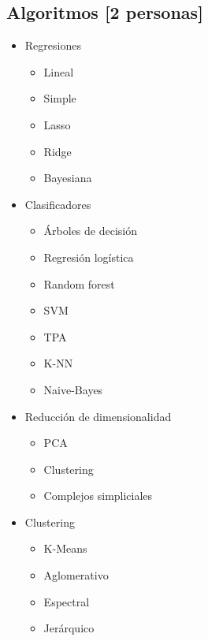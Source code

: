 \documentclass{article}
\begin{document}
        \subsection{Algoritmos [2 personas]}
            \begin{itemize}
                \item Regresiones
                \begin{itemize}
                    \item Lineal
                    \item Simple
                    \item Lasso
                    \item Ridge
                    \item Bayesiana
                \end{itemize}

                \item Clasificadores
                \begin{itemize}
                    \item Árboles de decisión
                    \item Regresión logística
                    \item Random forest
                    \item SVM
                    \item TPA
                    \item K-NN
                    \item Naive-Bayes
                \end{itemize}

                \item Reducción de dimensionalidad
                \begin{itemize}
                    \item PCA
                    \item Clustering
                    \item Complejos simpliciales
                \end{itemize}

                \item Clustering
                \begin{itemize}
                    \item K-Means
                    \item Aglomerativo
                    \item Espectral
                    \item Jerárquico
                \end{itemize}
            \end{itemize}
        
\end{document}
